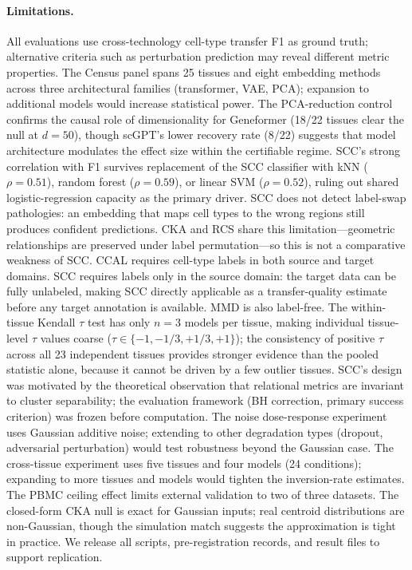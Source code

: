 \documentclass[11pt]{article}
\begin{document}
\paragraph{Limitations.} All evaluations use cross-technology cell-type
transfer F1 as ground truth; alternative criteria such as perturbation
prediction may reveal different metric properties. The Census panel
spans 25 tissues and eight embedding methods across three architectural
families (transformer, VAE, PCA); expansion to additional models would
increase statistical power. The PCA-reduction control confirms the
causal role of dimensionality for Geneformer (18/22 tissues clear the
null at $d = 50$), though scGPT's lower recovery rate (8/22) suggests
that model architecture modulates the effect size within the certifiable
regime. SCC's strong correlation with F1 survives replacement of the
SCC classifier with kNN ($\rho = 0.51$), random forest ($\rho = 0.59$),
or linear SVM ($\rho = 0.52$), ruling out shared logistic-regression
capacity as the primary driver. SCC does not detect label-swap pathologies: an embedding that maps cell
types to the wrong regions still produces confident predictions. CKA and
RCS share this limitation---geometric relationships are preserved under
label permutation---so this is not a comparative weakness of SCC. CCAL requires cell-type labels in both source and target
domains. SCC requires labels only in the source domain: the target
data can be fully unlabeled, making SCC directly applicable as a
transfer-quality estimate before any target annotation is available.
MMD is also label-free. The within-tissue Kendall $\tau$ test has only $n = 3$ models per
tissue, making individual tissue-level $\tau$ values coarse ($\tau \in
\{-1, -1/3, +1/3, +1\}$); the consistency of positive $\tau$ across
all 23 independent tissues provides stronger evidence than the pooled
statistic alone, because it cannot be driven by a few outlier tissues. SCC's design was motivated by the theoretical observation that
relational metrics are invariant to cluster separability; the
evaluation framework (BH correction, primary success criterion) was
frozen before computation. The noise dose-response experiment uses Gaussian additive
noise; extending to other degradation types (dropout, adversarial
perturbation) would test robustness beyond the Gaussian case. The
cross-tissue experiment uses five tissues and four models (24
conditions); expanding to more tissues and models would tighten the
inversion-rate estimates. The PBMC ceiling effect limits external
validation to two of three datasets. The closed-form CKA null is exact
for Gaussian inputs; real centroid distributions are non-Gaussian, though
the simulation match suggests the approximation is tight in practice. We
release all scripts, pre-registration records, and result files to
support replication.
\end{document}
